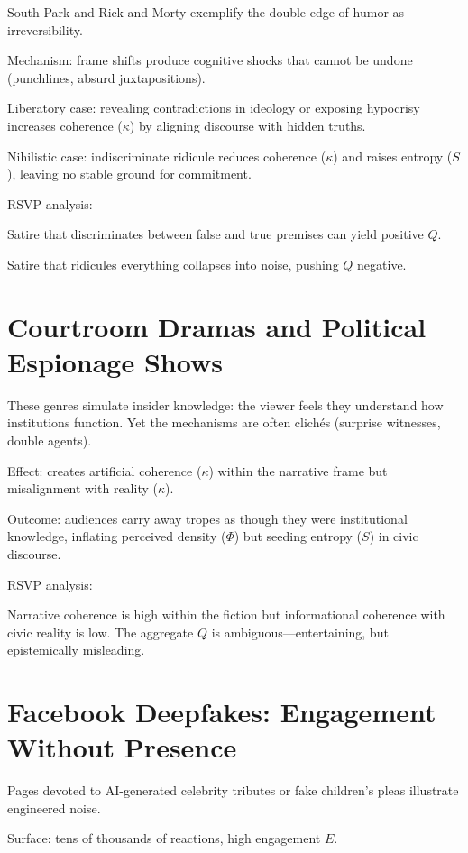 \documentclass{book}
\begin{document}
South Park and Rick and Morty exemplify the double edge of humor-as-irreversibility.

Mechanism: frame shifts produce cognitive shocks that cannot be undone (punchlines, absurd juxtapositions).

Liberatory case: revealing contradictions in ideology or exposing hypocrisy increases coherence (\( \kappa \)) by aligning discourse with hidden truths.

Nihilistic case: indiscriminate ridicule reduces coherence (\( \kappa \)) and raises entropy (\( S \)), leaving no stable ground for commitment.

RSVP analysis:

Satire that discriminates between false and true premises can yield positive \( Q \).

Satire that ridicules everything collapses into noise, pushing \( Q \) negative.

\section{Courtroom Dramas and Political Espionage Shows}

These genres simulate insider knowledge: the viewer feels they understand how institutions function. Yet the mechanisms are often clichés (surprise witnesses, double agents).

Effect: creates artificial coherence (\( \kappa \)) within the narrative frame but misalignment with reality (\( \kappa \)).

Outcome: audiences carry away tropes as though they were institutional knowledge, inflating perceived density (\( \Phi \)) but seeding entropy (\( S \)) in civic discourse.

RSVP analysis:

Narrative coherence is high within the fiction but informational coherence with civic reality is low. The aggregate \( Q \) is ambiguous—entertaining, but epistemically misleading.

\section{Facebook Deepfakes: Engagement Without Presence}

Pages devoted to AI-generated celebrity tributes or fake children’s pleas illustrate engineered noise.

Surface: tens of thousands of reactions, high engagement \( E \).
\end{document}
